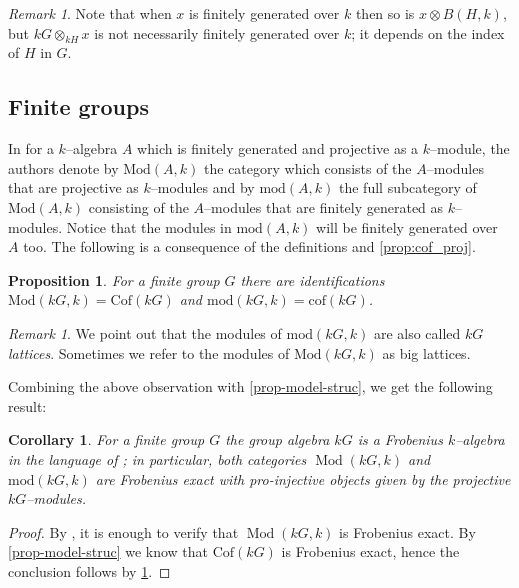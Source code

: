 \documentclass{amsart}
\DeclareMathOperator{\Mod}{Mod}
\numberwithin{equation}{section}%
\newtheorem{proposition}[equation]{Proposition}
\newtheorem{corollary}[equation]{Corollary}
\theoremstyle{remark}
\newtheorem{remark}[equation]{Remark}
\begin{document}
\begin{remark}
    Note that when $x$ is finitely generated over $k$ then so is $x\otimes B(H,k)$, but $kG\otimes_{kH}x$ is not necessarily finitely generated over $k$; it depends on the index of $H$ in $G$.
\end{remark}


\subsection{Finite groups}
In \cite[Section~2]{BBIKP25} for a $k$--algebra $A$ which is finitely generated and projective as a $k$--module, the authors denote by $\mathrm{Mod}(A,k)$ the category which consists of the $A$--modules that are projective as $k$--modules and by $\mathrm{mod}(A,k)$ the full subcategory of $\mathrm{Mod}(A,k)$ consisting of the $A$--modules that are finitely generated as $k$--modules. Notice that the modules in $\mathrm{mod}(A,k)$ will be finitely generated over $A$ too. The following is a consequence of the definitions and \cref{prop:cof_proj}.

\begin{proposition}
\label{prop:identifications}
For a finite group $G$ there are identifications $\mathrm{Mod}(kG,k)=\mathrm{Cof}(kG)$ and $\mathrm{mod}(kG,k)=\mathrm{cof}(kG)$.
\end{proposition}


\begin{remark}
    We point out that the modules of $\mathrm{mod}(kG,k)$ are also called $kG$ \textit{lattices}. Sometimes we refer to the modules of $\mathrm{Mod}(kG,k)$ as big lattices.
\end{remark}

Combining the above observation with \cref{prop-model-struc}, we get the following result:

\begin{corollary}\label{cor-frobenius}
For a finite group $G$ the group algebra $kG$ is a Frobenius $k$--algebra in the language of \cite{BBIKP25}; in particular, both categories $\Mod(kG,k)$ and $\mathrm{mod}(kG,k)$ are Frobenius exact with pro-injective objects given by the projective $kG$--modules.  
\end{corollary}

\begin{proof}
    By \cite[Lemma~2.6]{BBIKP25}, it is enough to verify that $\Mod(kG,k)$ is Frobenius exact. By \cref{prop-model-struc} we know that $\mathrm{Cof}(kG)$ is Frobenius exact, hence the conclusion follows by \cref{prop:identifications}.
\end{proof}
\end{document}
